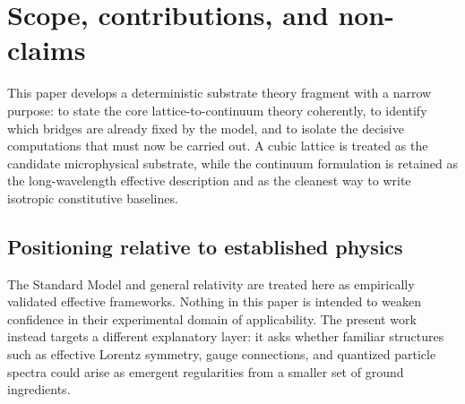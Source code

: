 \section{Scope, contributions, and non-claims}
\label{sec:scope}

This paper develops a deterministic substrate theory fragment with a narrow purpose:
to state the core lattice-to-continuum theory coherently, to identify which bridges are already fixed by the model,
and to isolate the decisive computations that must now be carried out.
A cubic lattice is treated as the candidate microphysical substrate, while the continuum formulation is retained as the
long-wavelength effective description and as the cleanest way to write isotropic constitutive baselines.

\subsection{Positioning relative to established physics}
The Standard Model and general relativity are treated here as empirically validated effective frameworks.
Nothing in this paper is intended to weaken confidence in their experimental domain of applicability.
The present work instead targets a different explanatory layer: it asks whether familiar structures such as
effective Lorentz symmetry, gauge connections, and quantized particle spectra could arise as emergent regularities
from a smaller set of ground ingredients.

